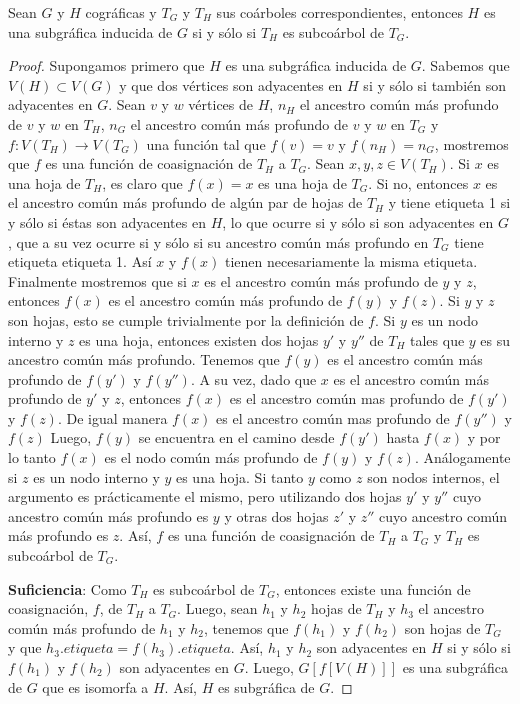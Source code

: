 \begin{lemma}\label{lema_subcoa_01}
    Sean $G$ y $H$ cográficas y $T_G$ y $T_H$ sus coárboles correspondientes, entonces $H$ es una subgráfica inducida de $G$ si y sólo si $T_H$ es subcoárbol de $T_G$.
\end{lemma}

\begin{proof}

    Supongamos primero que $H$ es una subgráfica inducida de $G$. Sabemos que
    $V(H)\subset V(G)$ y que dos vértices son adyacentes en $H$ si y sólo si
    también son adyacentes en $G$. Sean $v$ y $w$ vértices de $H$, $n_H$ el
    ancestro común más profundo de $v$ y $w$ en $T_H$, $n_G$ el ancestro común
    más profundo de $v$ y $w$ en $T_G$ y $f:V(T_H)\rightarrow V(T_G)$ una
    función tal que $f(v)=v$ y $f(n_H) = n_G$, mostremos que $f$ es una función
    de coasignación de $T_H$ a $T_G$. Sean $x,y,z\in V(T_H)$. Si $x$ es una
    hoja de $T_H$, es claro que $f(x) = x$ es una hoja de $T_G$. Si no,
    entonces $x$ es el ancestro común más profundo de algún par de hojas de
    $T_H$ y tiene etiqueta 1 si y sólo si éstas son adyacentes en $H$, lo que
    ocurre si y sólo si son adyacentes en $G$, que a su vez ocurre si y sólo si
    su ancestro común más profundo en $T_G$ tiene etiqueta etiqueta 1. Así $x$
    y $f(x)$ tienen necesariamente la misma etiqueta. Finalmente mostremos que
    si $x$ es el ancestro común más profundo de $y$ y $z$, entonces $f(x)$ es
    el ancestro común más profundo de $f(y)$ y $f(z)$. Si $y$ y $z$ son hojas,
    esto se cumple trivialmente por la definición de $f$. Si $y$ es un nodo
    interno y $z$ es una hoja, entonces existen dos hojas $y'$ y $y''$ de $T_H$
    tales que $y$ es su ancestro común más profundo. Tenemos que $f(y)$ es el
    ancestro común más profundo de $f(y')$ y $f(y'')$. A su vez, dado que $x$
    es el ancestro común más profundo de $y'$ y $z$, entonces $f(x)$ es el
    ancestro común mas profundo de $f(y')$ y $f(z)$. De igual manera $f(x)$ es
    el ancestro común mas profundo de $f(y'')$ y $f(z)$ Luego, $f(y)$ se
    encuentra en el camino desde $f(y')$ hasta $f(x)$ y por lo tanto $f(x)$ es
    el nodo común más profundo de $f(y)$ y $f(z)$. Análogamente si $z$ es un
    nodo interno y $y$ es una hoja. Si tanto $y$ como $z$ son nodos internos,
    el argumento es prácticamente el mismo, pero utilizando dos hojas $y'$ y
    $y''$ cuyo ancestro común más profundo es $y$ y otras dos hojas $z'$ y
    $z''$ cuyo ancestro común más profundo es $z$. Así, $f$ es una función de
    coasignación de $T_H$ a $T_G$ y $T_H$ es subcoárbol de $T_G$.

    \textbf{Suficiencia}: Como $T_H$ es subcoárbol de $T_G$, entonces existe
    una función de coasignación, $f$, de $T_H$ a $T_G$. Luego, sean $h_1$ y
    $h_2$ hojas de $T_H$ y $h_3$ el ancestro común más profundo de $h_1$ y
    $h_2$, tenemos que $f(h_1)$ y $f(h_2)$ son hojas de $T_G$ y que
    $h_3.etiqueta = f(h_3).etiqueta$. Así, $h_1$ y $h_2$ son adyacentes en $H$
    si y sólo si $f(h_1)$ y $f(h_2)$ son adyacentes en $G$. Luego, $G[f[V(H)]]$
    es una subgráfica de $G$ que es isomorfa a $H$. Así, $H$ es subgráfica de
    $G$.

\end{proof}

